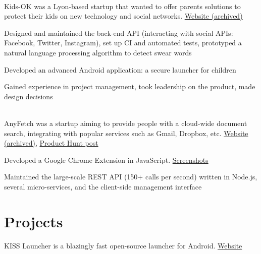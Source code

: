 \documentclass[
  english,
  a4paper
]{resume-openfont}
\begin{document}
\begin{minipage}[t]{0.66\textwidth}
%
%
\\
Kids-OK was a Lyon-based startup that wanted to offer parents solutions to protect their kids on new technology and social networks. \href{https://i.imgur.com/ZAXWuZN.png}{Website (archived)}
\vspace{\topsep}
\begin{tightemize}
\item Designed and maintained the back-end API (interacting with social APIs: Facebook, Twitter, Instagram), set up CI and automated tests, prototyped a natural language processing algorithm to detect swear words
\item Developed an advanced Android application: a secure launcher for children
\item Gained experience in project management, took leadership on the product, made design decisions
\end{tightemize}
\sectionsep

%
%
\\
AnyFetch was a startup aiming to provide people with a cloud-wide document search, integrating with popular services such as Gmail, Dropbox, etc. \href{https://i.imgur.com/B3MMD6Y.png}{Website (archived)}, \href{https://www.producthunt.com/posts/anyfetch}{Product Hunt post}
\vspace{\topsep}
\begin{tightemize}
\item Developed a Google Chrome Extension in JavaScript. \href{https://i.imgur.com/yql5v1z.png}{Screenshots}
\item Maintained the large-scale REST API (150+ calls per second) written in Node.js, several micro-services, and the client-side management interface
\end{tightemize}


\section{Projects}
%
%
KISS Launcher is a blazingly fast open-source launcher for Android. \href{http://kisslauncher.com/}{Website}
\sectionsep

\end{minipage}
\end{document}
